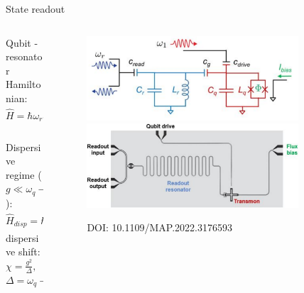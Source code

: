 \documentclass[aspectratio=169,10pt]{beamer}
\begin{document}
\begin{frame}{State readout}
  \begin{columns}
    \begin{column}{0.35\textwidth}
    Qubit - resonator Hamiltonian:
    \begin{equation*}
      \hat{H} = \hbar\omega_r\hat{a}\hat{a}^\dagger - \frac{\hbar\omega_{01}}{2}\hat{\sigma}_z + \hbar g(\hat{\sigma}^+\hat{a}+\hat{\sigma}^-\hat{a}^\dagger)
    \end{equation*}\\
    \vspace{1.5em}
    Dispersive regime ($g \ll \omega_q - \omega_r$):
    \begin{equation*}
      \hat{H}_{disp} = \hbar(\omega_r - \chi\hat{\sigma}_z)\hat{a}^\dagger\hat{a} - \frac{\hbar}{2}(\omega_{01}+\chi)\hat{\sigma}_z
    \end{equation*}
    dispersive shift: $\chi = \frac{g^2}{\Delta},$ \hfill $\Delta = \omega_q - \omega_r$
  \end{column}
    \begin{column}{0.65\textwidth}
      \begin{center}
        \begin{figure}
          \vspace{2mm}
          \includegraphics[width=0.85\textwidth]{figures/TransmonCircuit.png}
          \vfill
          \includegraphics[width=0.85\textwidth]{figures/TransmonBoard.png}
          \caption{DOI: 10.1109/MAP.2022.3176593}
        \end{figure}
      \end{center}
    \end{column}
  \end{columns}
\end{frame}
\end{document}
